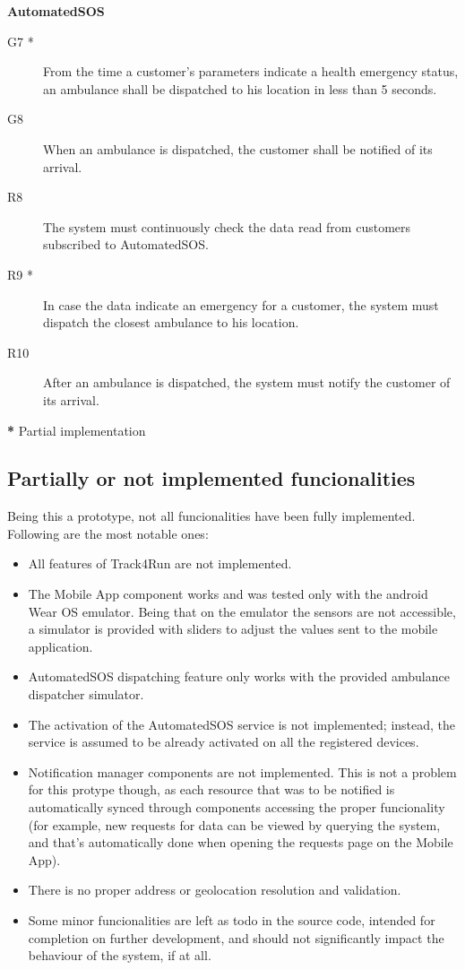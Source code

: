 \documentclass[../main.tex]{subfiles}
\begin{document}
\vspace{8mm}


	{\bf AutomatedSOS}

	\vspace{0.5cm}

	\begin{description}
		\item [G7 *]  From the time a customer's parameters indicate a health emergency status, an ambulance shall be dispatched to his location in less than 5 seconds.
		\item [G8]  When an ambulance is dispatched, the customer shall be notified of its arrival.

		\item [R8] The system must continuously check the data read from customers subscribed to AutomatedSOS.
		\item [R9 *] In case the data indicate an emergency for a customer, the system must dispatch the closest ambulance to his location.
		\item [R10] After an ambulance is dispatched, the system must notify the customer of its arrival.

	\end{description}


\textbf{*} Partial implementation

\subsection{Partially or not implemented funcionalities}

Being this a prototype, not all funcionalities have been fully implemented. Following are the most notable ones:

\begin{itemize}
	\item All features of Track4Run are not implemented.
	\item The Mobile App component works and was tested only with the android Wear OS emulator. Being that on the emulator the sensors are not accessible, a simulator is provided with sliders to adjust the values sent to the mobile application.
	\item AutomatedSOS dispatching feature only works with the provided ambulance dispatcher simulator.
	\item The activation of the AutomatedSOS service is not implemented; instead, the service is assumed to be already activated on all the registered devices.
	\item Notification manager components are not implemented. This is not a problem for this protype though, as each resource that was to be notified is automatically synced through components accessing the proper funcionality (for example, new requests for data can be viewed by querying the system, and that's automatically done when opening the requests page on the Mobile App).
	\item There is no proper address or geolocation resolution and validation.
	\item Some minor funcionalities are left as todo in the source code, intended for completion on further development, and should not significantly impact the behaviour of the system, if at all.
\end{itemize}
\end{document}
